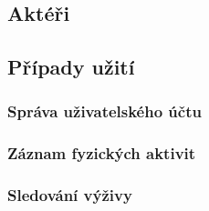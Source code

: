 

\subsection{Aktéři}


\subsection{Případy užití}


\subsubsection{Správa uživatelského účtu}

\subsubsection{Záznam fyzických aktivit}

\subsubsection{Sledování výživy}

